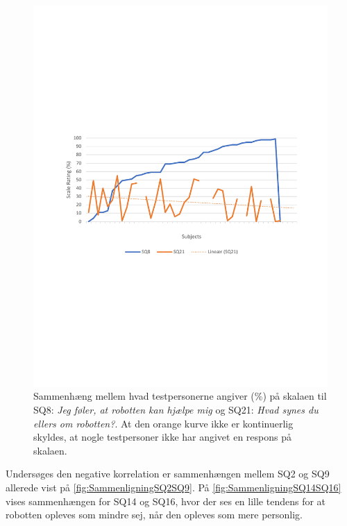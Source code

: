 %
\begin{figure}[H]
	\centering
	\includegraphics[width=\textwidth]{Figure/Korrelationsgrafer/SQ8+SQ21}
	\caption{Sammenhæng mellem hvad testpersonerne angiver (\%) på skalaen til SQ8: \textit{Jeg føler, at robotten kan hjælpe mig} og SQ21: \textit{Hvad synes du ellers om robotten?}. At den orange kurve ikke er kontinuerlig skyldes, at nogle testpersoner ikke har angivet en respons på skalaen.}
	\label{fig:SammenligningSQ8SQ21}
\end{figure}
\noindent
%
Undersøges den negative korrelation er sammenhængen mellem SQ2 og SQ9 allerede vist på \autoref{fig:SammenligningSQ2SQ9}. På \autoref{fig:SammenligningSQ14SQ16} vises sammenhængen for SQ14 og SQ16, hvor der ses en lille tendens for at robotten opleves som mindre sej, når den opleves som mere personlig.
%
